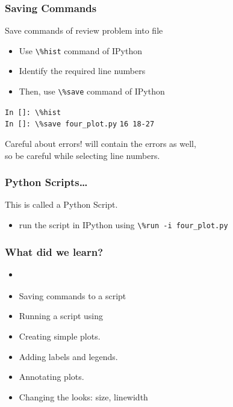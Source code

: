 \documentclass[14pt,compress]{beamer}
\newcommand{\typ}[1]{\lstinline{#1}}
\newcommand{\kwrd}[1]{ \texttt{\textbf{\color{blue}{#1}}}  }
\begin{document}
\begin{frame}[fragile]
\frametitle{Saving Commands}
Save commands of review problem into file
\begin{itemize}
\item Use \typ{\%hist} command of IPython 
\item Identify the required line numbers
\item Then, use \typ{\%save} command of IPython
\end{itemize}
\typ{In []: \%hist}\\
\typ{In []: \%save four_plot.py} \alert{\typ{16 18-27}} 
\begin{block}{Careful about errors!}
  \kwrd{\%hist} will contain the errors as well,\\
  so be careful while selecting line numbers.
\end{block}
\end{frame}

\begin{frame}
\frametitle{Python Scripts\ldots}
 This is called a Python Script.
 \begin{itemize}
 \item run the script in IPython using \typ{\%run -i four_plot.py}\\
 \end{itemize}
\end{frame}

\begin{frame}[fragile]
  \frametitle{What did we learn?}
  \begin{itemize}
    \item \kwrd{\%hist}
    \item Saving commands to a script
    \item Running a script using \kwrd{\%run -i}
    \item Creating simple plots.
    \item Adding labels and legends.
    \item Annotating plots.
    \item Changing the looks: size, linewidth
  \end{itemize}
\end{frame}
\end{document}
